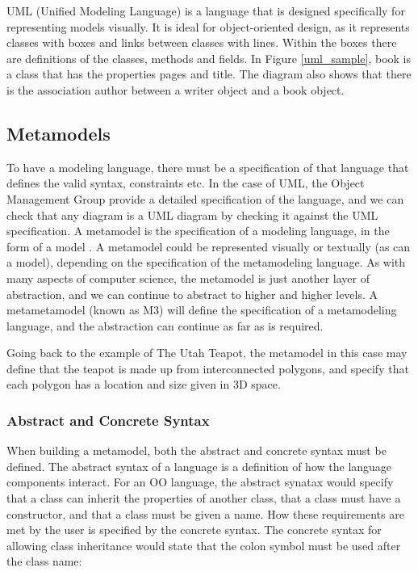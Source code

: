 UML (Unified Modeling Language) is a language that is designed specifically for representing models visually. It is ideal for object-oriented design, as it represents classes with boxes and links between classes with lines. Within the boxes there are definitions of the classes, methods and fields. In Figure \ref{uml_sample}, book is a class that has the properties pages and title. The diagram also shows that there is the association author between a writer object and a book object.

\subsection{Metamodels}
To have a modeling language, there must be a specification of that language that defines the valid syntax, constraints etc. In the case of UML, the Object Management Group provide a detailed specification \citep{umlSpec} of the language, and we can check that any diagram is a UML diagram by checking it against the UML specification.
A metamodel is the specification of a modeling language, in the form of a model \citep{brambillaBook}. A metamodel could be represented visually or textually (as can a model), depending on the specification of the metamodeling language. As with many aspects of computer science, the metamodel is just another layer of abstraction, and we can continue to abstract to higher and higher levels. A metametamodel (known as M3) will define the specification of a metamodeling language, and the abstraction can continue as far as is required.

Going back to the example of The Utah Teapot, the metamodel in this case may define that the teapot is made up from interconnected polygons, and specify that each polygon has a location and size given in 3D space. 

\subsubsection{Abstract and Concrete Syntax}

When building a metamodel, both the abstract and concrete syntax must be defined. The abstract syntax of a language is a definition of how the language components interact. For an OO language, the abstract synatax would specify that a class can inherit the properties of another class, that a class must have a constructor, and that a class must be given a name. How these requirements are met by the user is specified by the concrete syntax. The concrete syntax for allowing class inheritance would state that the colon symbol must be used after the class name:

